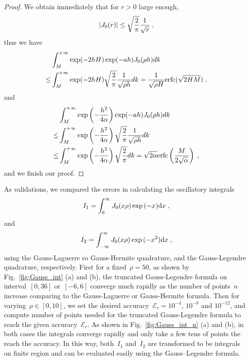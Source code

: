 \begin{proof}
We obtain immediately that for $r>0$ large enough,     
\begin{equation*}
   \left\lvert J_0(r)\right\rvert\leq \sqrt{\frac{2}{\pi}} \frac{1}{\sqrt{r}}\;, 
\end{equation*}
thus we have 
\begin{align*}
   & \int_M^{+\infty}  \exp(-2hH)\exp(-ah)  J_0(\rho h)d k \\
\leq & \int_M^{+\infty}  \exp(-2hH)\sqrt{\frac{2}{\pi}} \frac{1}{\sqrt{\rho h}} d k=\frac{1}{\sqrt{\rho H}}\mathrm{erfc}(\sqrt{2HM})\;,
\end{align*}
and 
\begin{align*}
  &\int_M^{+\infty}  \exp\left(-\frac{h^2}{4\alpha}\right)  \exp(-ah)  J_0(\rho h)d k \\
  \leq &\int_M^{+\infty} \exp\left(-\frac{h^2}{4\alpha}\right)\sqrt{\frac{2}{\pi}} \frac{1}{\sqrt{\rho h}} d k\\ 
  \leq &\int_M^{+\infty} \exp\left(-\frac{h^2}{4\alpha}\right)\sqrt{\frac{2}{\pi}} d k=\sqrt{2\alpha} \mathrm{erfc}\left(\frac{M}{2\sqrt{\alpha}}\right)\;,
\end{align*}
and we finish our proof.
\end{proof}

As validations, we compared the errors in calculating the oscillatory integrals
\begin{equation}\label{eq:I1}
    I_1=\int_0^{\infty} J_0(x \rho) \exp{(-x)} \mathrm{d}x\;,
\end{equation}
and
\begin{equation}\label{eq:I2}
    I_2=\int_{-\infty}^{\infty} J_0(x \rho) \exp{(-x^2)} \mathrm{d}x\;,
\end{equation}
using the Gauss-Laguerre ro Gauss-Hermite quadrature, and the Gauss-Legendre quadrature, respectively.
First for a fixed~$\rho = 50$, as shown by Fig.~\ref{fig:Gauss_int} (a) and (b), the truncated Gauss-Legendre formula on interval~$[0, 36]$ or~$[-6, 6]$ converge much rapidly as the number of points~$n$ increase comparing to the Gauss-Laguerre or Gauss-Hermite formula.
Then for varying~$\rho \in [0, 10]$, we set the desired accuracy~$\mathcal{E}_r = 10^{-4}$, $10^{-8}$ and $10^{-12}$, and compute number of points needed for the truncated Gauss-Legendre formula to reach the given accuracy~$\mathcal{E}_r$.
As shown in Fig.~\ref{fig:Gauss_int_n} (a) and (b), in both cases the integrals converge rapidly and only take a few tens of points the reach the accuracy.
In this way, both~$I_1$ and~$I_2$ are transformed to be integrals on finite region and can be evaluated easily using the Gauss–Legendre formula.

